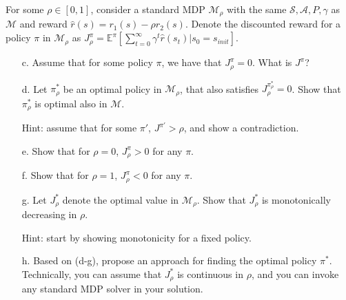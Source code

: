For some $\rho \in [0,1]$, consider a standard MDP $\mathcal{M}_{\rho}$ with the same $\mathcal{S},\mathcal{A},P,\gamma$ as $\mathcal{M}$ and reward $\hat{r}(s) = r_1(s) - \rho r_2(s).$ Denote the discounted reward for a policy $\pi$ in $\mathcal{M}_{\rho}$ as $J_{\rho}^\pi = \mathbb{E}^\pi \left[ \sum_{t=0}^\infty \gamma^t \hat{r}(s_t)|s_0 = s_{init}\right]$.

\begin{itemize}
    \item[c.] Assume that for some policy $\pi$, we have that $J_{\rho}^\pi = 0$. What is $J^\pi$?
    \item[d.] Let $\pi_\rho^*$ be an optimal policy in $\mathcal{M}_{\rho}$, that also satisfies  $J_{\rho}^{\pi_\rho^*} = 0$. Show that $\pi_\rho^*$ is optimal also in $\mathcal{M}$.
    
    Hint: assume that for some $\pi'$, $J^{\pi'} > \rho$, and show a contradiction.
    
    \item[e.] Show that for $\rho=0$, $J_{\rho}^\pi > 0$ for any $\pi$.
    \item[f.] Show that for $\rho=1$, $J_{\rho}^\pi < 0$ for any $\pi$.
    \item[g.] Let $J_{\rho}^*$ denote the optimal value in $\mathcal{M}_{\rho}$. Show that $J_{\rho}^*$ is monotonically decreasing in $\rho$.
    
    Hint: start by showing monotonicity for a fixed policy.
    \item[h.] Based on (d-g), propose an approach for finding the optimal policy $\pi^*$. Technically, you can assume that $J_{\rho}^*$ is continuous in $\rho$, and you can invoke any standard MDP solver in your solution.
    
\end{itemize}